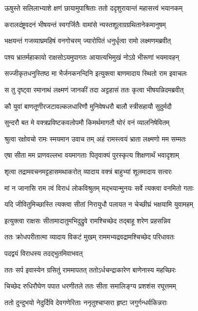 \twolineshloka
{ऊषुस्ते सलिलाभ्याशे क्षणं छायामुपाश्रिताः}
{ततो ददृशुरायान्तं महासत्त्वं भयानकम्} %

\twolineshloka
{करालदंष्ट्रवदनं भीषयन्तं स्वगर्जितैः}
{वामांसे न्यस्तशूलाग्रग्रथितानेकमानुषम्} %

\twolineshloka
{भक्षयन्तं गजव्याघ्रमहिषं वनगोचरम्}
{ज्यारोपितं धनुर्धृत्वा रामो लक्ष्मणमब्रवीत्} %

\twolineshloka
{पश्य भ्रातर्महाकायो राक्षसोऽयमुपागतः}
{आयात्यभिमुखं नोऽग्रे भीरूणां भयमावहन्} %

\twolineshloka
{सज्जीकृतधनुस्तिष्ठ मा भैर्जनकनन्दिनि}
{इत्युक्त्वा बाणमादाय स्थितो राम इवाचलः} %

\twolineshloka
{स तु दृष्ट्वा रमानाथं लक्ष्मणं जानकीं तदा}
{अट्टहासं ततः कृत्वा भीषयन्निदमब्रवीत्} %

\twolineshloka
{कौ युवां बाणतूणीरजटावल्कलधारिणौ}
{मुनिवेषधरौ बालौ स्त्रीसहायौ सुदुर्मदौ} %

\twolineshloka
{सुन्दरौ बत मे वक्त्रप्रविष्टकवलोपमौ}
{किमर्थमागतौ घोरं वनं व्यालनिषेवितम्} %

\twolineshloka
{श्रुत्वा रक्षोवचो रामः स्मयमान उवाच तम्}
{अहं रामस्त्वयं भ्राता लक्ष्मणो मम सम्मतः} %

\twolineshloka
{एषा सीता मम प्राणवल्लभा वयमागताः}
{पितृवाक्यं पुरस्कृत्य शिक्षणार्थं भवादृशाम्} %

\twolineshloka
{शृत्वा तद्रामवचनमट्टहासमथाकरोत्}
{व्यादाय वक्त्रं बाहुभ्यां शूलमादाय सत्वरः} %

\twolineshloka
{मां न जानासि राम त्वं विराधं लोकविश्रुतम्}
{मद्भयान्मुनयः सर्वे त्यक्त्वा वनमितो गताः} %

\twolineshloka
{यदि जीवितुमिच्छास्ति त्यक्त्वा सीतां निरायुधौ}
{पलायत न चेच्छीघ्रं भक्षयामि युवामहम्} %

\twolineshloka
{इत्युक्त्वा राक्षसः सीतामादातुमभिदुद्रुवे}
{रामश्चिच्छेद तद्बाहू शरेण प्रहसन्निव} %

\twolineshloka
{ततः क्रोधपरीतात्मा व्यादाय विकटं मुखम्}
{राममभ्यद्रवद्रामश्चिच्छेद परिधावतः} %

\onelineshloka
{पदद्वयं विराधस्य तदद्भुतमिवाभवत्} %


\twolineshloka
{ततः सर्प इवास्येन ग्रसितुं राममापतत्}
{ततोऽर्धचन्द्राकारेण बाणेनास्य महच्छिरः} %

\twolineshloka
{चिच्छेद रुधिरौघेण पपात धरणीतले}
{ततः सीता समालिङ्ग्य प्रशशंस रघूत्तमम्} %

\twolineshloka
{ततो दुन्दुभयो नेदुर्दिवि देवगणेरिताः}
{ननृतुश्चाप्सरा हृष्टा जगुर्गन्धर्वकिन्नराः} %

